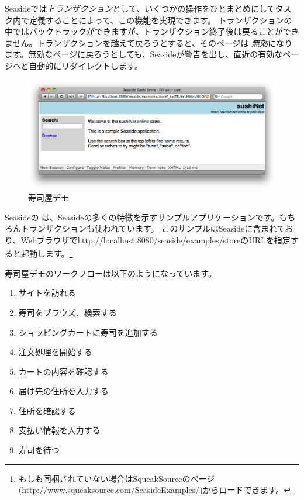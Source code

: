 \documentclass[a4paper,10pt,twoside]{book}
\begin{document}
Seasideでは\emph{トランザクション}として、いくつかの操作をひとまとめにしてタスク内で定義することによって、この機能を実現できます。
トランザクションの中ではバックトラックができますが、トランザクション終了後は戻ることができません。トランザクションを越えて戻ろうとすると、そのページは \emph{無効}になります。無効なページに戻ろうとしても、Seasideが警告を出し、直近の有効なページへと自動的にリダイレクトします。

\begin{figure}[ht]
\begin{center}
\includegraphics[width=\textwidth]{sushiStore}
\caption{寿司屋デモ}
\end{center}
\end{figure}

Seasideの  は、Seasideの多くの特徴を示すサンプルアプリケーションです。もちろんトランザクションも使われています。
このサンプルはSeasideに含まれており、Webブラウザで\url{http://localhost:8080/seaside/examples/store}のURLを指定すると起動します。\footnote{もしも同梱されていない場合はSqueakSourceのページ(\url{http://www.squeaksource.com/SeasideExamples/})からロードできます。 }

寿司屋デモのワークフローは以下のようになっています。
\begin{enumerate}[itemsep=0pt]
  \item サイトを訪れる
  \item 寿司をブラウズ、検索する
  \item ショッピングカートに寿司を追加する
  \item 注文処理を開始する
  \item カートの内容を確認する
  \item 届け先の住所を入力する
  \item 住所を確認する
  \item 支払い情報を入力する
  \item 寿司を待つ
\end{enumerate}
\end{document}
